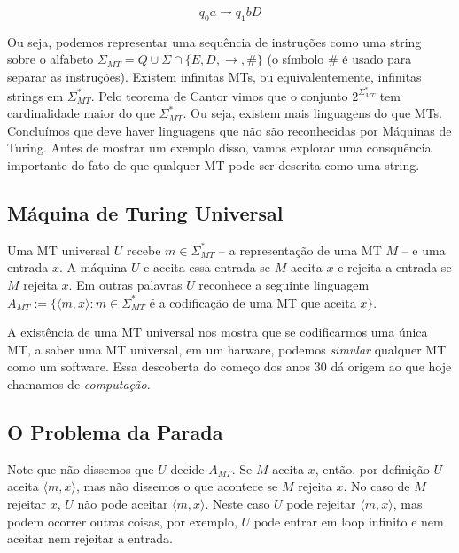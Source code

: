 \begin{displaymath}
  q_0 a \to q_1 b D
\end{displaymath}

Ou seja, podemos representar uma sequência de instruções como uma string sobre o alfabeto $\Sigma_{MT} = Q \cup \Sigma \cap \{E, D, \to, \#\}$ (o símbolo $\#$ é usado para separar as instruções).
Existem infinitas MTs, ou equivalentemente, infinitas strings em $\Sigma_{MT}^*$.
Pelo teorema de Cantor vimos que o conjunto $2^{\Sigma_{MT}^*}$ tem cardinalidade maior do que $\Sigma_{MT}^*$.
Ou seja, existem mais linguagens do que MTs.
Concluímos que deve haver linguagens que não são reconhecidas por Máquinas de Turing.
Antes de mostrar um exemplo disso, vamos explorar uma consquência importante do fato de que qualquer MT pode ser descrita como uma string.

\subsection{Máquina de Turing Universal}

Uma MT universal $U$ recebe $m \in \Sigma_{MT}^*$ -- a representação de uma MT $M$ -- e uma entrada $x$.
A máquina $U$ e aceita essa entrada se $M$ aceita $x$ e rejeita a entrada se $M$ rejeita $x$.
Em outras palavras $U$ reconhece a seguinte linguagem $A_{MT} := \{\langle m, x \rangle : m \in \Sigma_{MT}^*$ é a codificação de uma MT que aceita $x\}$. 

A existência de uma MT universal nos mostra que se codificarmos uma única MT, a saber uma MT universal, em um harware, podemos {\em simular} qualquer MT como um software.
Essa descoberta do começo dos anos 30 dá origem ao que hoje chamamos de {\em computação}.


\subsection{O Problema da Parada}

Note que não dissemos que $U$ decide $A_{MT}$.
Se $M$ aceita $x$, então, por definição $U$ aceita $\langle m, x\rangle$, mas não dissemos o que acontece se $M$ rejeita $x$.
No caso de $M$ rejeitar $x$, $U$ não pode aceitar $\langle m, x \rangle$.
Neste caso $U$ pode rejeitar $\langle m, x \rangle$, mas podem ocorrer outras coisas, por exemplo, $U$ pode entrar em loop infinito e nem aceitar nem rejeitar a entrada.


